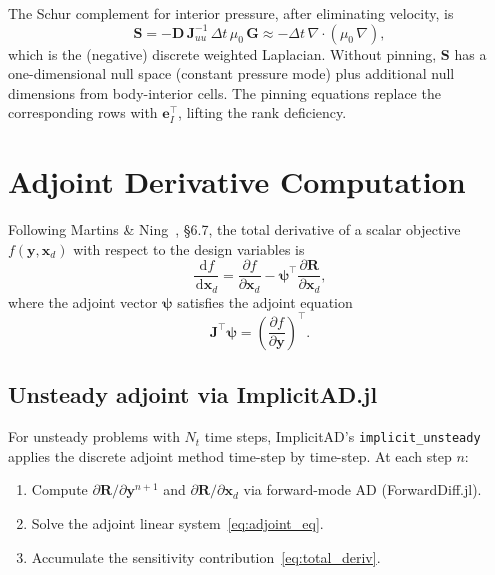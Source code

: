 \documentclass[11pt]{article}
\newcommand{\vect}[1]{\bm{#1}}
\newcommand{\dd}{\,\mathrm{d}}
\newcommand{\pp}{\partial}
\begin{document}
The Schur complement for interior pressure, after eliminating velocity, is
\begin{equation}
  \vect{S} = -\vect{D}\,\vect{J}_{uu}^{-1}\,\Delta t\,\mu_0\,\vect{G}
  \approx -\Delta t\,\nabla\cdot(\mu_0\,\nabla),
\end{equation}
which is the (negative) discrete weighted Laplacian.  Without pinning,
$\vect{S}$ has a one-dimensional null space (constant pressure mode) plus
additional null dimensions from body-interior cells.  The pinning
equations replace the corresponding rows with $\vect{e}_I^{\top}$,
lifting the rank deficiency.

\section{Adjoint Derivative Computation}
\label{sec:adjoint}

Following Martins \& Ning~\cite{Martins2021}, \S6.7, the total derivative
of a scalar objective $f(\vect{y},\vect{x}_d)$ with respect to the design
variables is
\begin{equation}\label{eq:total_deriv}
  \frac{\dd f}{\dd \vect{x}_d}
  = \frac{\pp f}{\pp \vect{x}_d}
  - \bm{\psi}^{\!\top}\frac{\pp\vect{R}}{\pp\vect{x}_d},
\end{equation}
where the adjoint vector $\bm\psi$ satisfies the adjoint equation
\begin{equation}\label{eq:adjoint_eq}
  \vect{J}^{\top}\bm{\psi}
  = \left(\frac{\pp f}{\pp\vect{y}}\right)^{\!\top}.
\end{equation}

\subsection{Unsteady adjoint via ImplicitAD.jl}

For unsteady problems with $N_t$ time steps, ImplicitAD's
\texttt{implicit\_unsteady} applies the discrete adjoint method
time-step by time-step.  At each step $n$:

\begin{enumerate}
  \item Compute $\pp\vect{R}/\pp\vect{y}^{n+1}$ and
    $\pp\vect{R}/\pp\vect{x}_d$ via forward-mode AD (ForwardDiff.jl).
  \item Solve the adjoint linear system~\eqref{eq:adjoint_eq}.
  \item Accumulate the sensitivity contribution~\eqref{eq:total_deriv}.
\end{enumerate}
\end{document}
